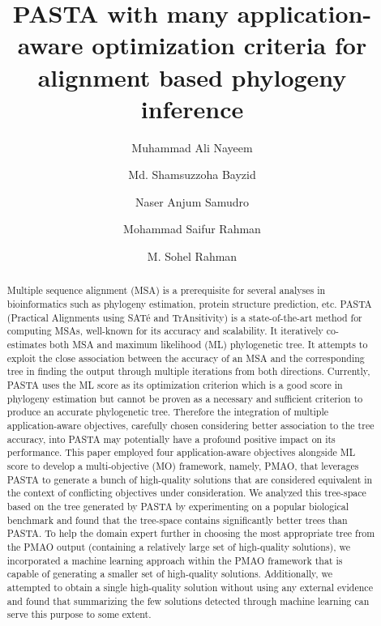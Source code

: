 \documentclass[a4paper,fleqn, review]{cas-dc}
\begin{document}
	

\title [mode = title]{PASTA with many application-aware optimization criteria for alignment based phylogeny inference}                      


\author[1]{Muhammad Ali Nayeem} 
\author[1]{Md. Shamsuzzoha Bayzid}
\author[1]{Naser Anjum Samudro}
\author[1]{Mohammad Saifur Rahman}
\author[1]{M. Sohel Rahman} \cormark[1]
\address[1]{Department of Computer Science \& Engineering, Bangladesh University of Engineering \& Technology, Dhaka 1205, Bangladesh}



\begin{abstract}
	Multiple sequence alignment (MSA) is a prerequisite for several analyses in bioinformatics such as phylogeny estimation, protein structure prediction, etc. PASTA (Practical Alignments using SAT\'e and TrAnsitivity) is a state-of-the-art method for computing MSAs, well-known for its accuracy and scalability. It iteratively co-estimates both MSA and maximum likelihood (ML) phylogenetic tree. It attempts to exploit the close association between the accuracy of an MSA and the corresponding tree in finding the output through multiple iterations from both directions. Currently, PASTA uses the ML score as its optimization criterion which is a good score in phylogeny estimation but cannot be proven as a necessary and sufficient criterion to produce an accurate phylogenetic tree. Therefore the integration of multiple application-aware objectives, carefully chosen considering better association to the tree accuracy, into PASTA may potentially have a profound positive impact on its performance. This paper employed four application-aware objectives alongside ML score to develop a multi-objective (MO) framework, namely, PMAO, that leverages PASTA to generate a bunch of high-quality solutions that are considered equivalent in the context of conflicting objectives under consideration. We analyzed this tree-space based on the tree generated by PASTA by experimenting on a popular biological benchmark and found that the tree-space contains significantly better trees than PASTA. 
	To help the domain expert further in choosing the most appropriate tree from the PMAO output (containing a relatively large set of high-quality solutions), we incorporated a machine learning approach within the PMAO framework that is capable of generating a smaller set of high-quality solutions. Additionally, we attempted to obtain a single high-quality solution without using any external evidence and found that summarizing the few solutions detected through machine learning can serve this purpose to some extent.
\end{abstract}
\end{document}
